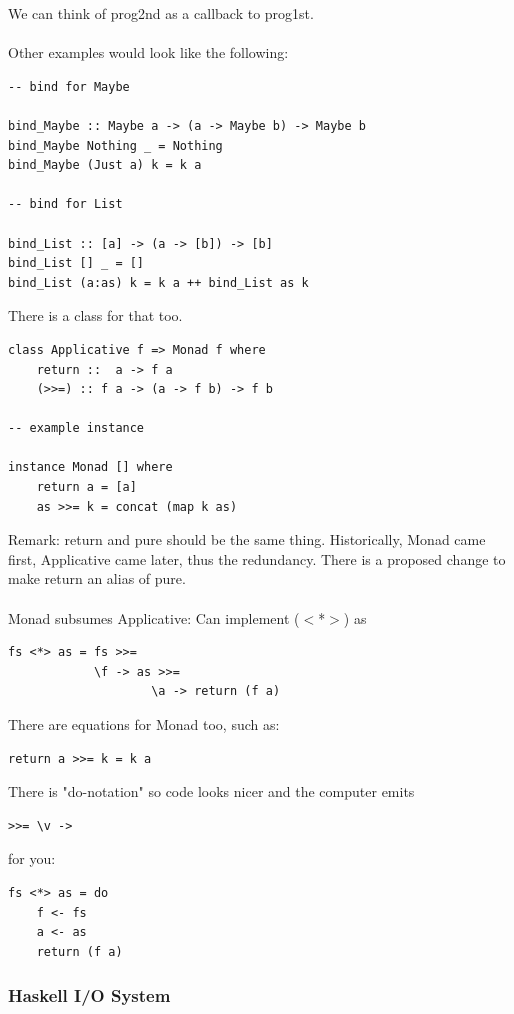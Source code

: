 \documentclass[12pt]{article}
\begin{document}
We can think of prog2nd as a callback to prog1st.\\
\\
Other examples would look like the following:

\begin{lstlisting}
-- bind for Maybe

bind_Maybe :: Maybe a -> (a -> Maybe b) -> Maybe b
bind_Maybe Nothing _ = Nothing
bind_Maybe (Just a) k = k a

-- bind for List

bind_List :: [a] -> (a -> [b]) -> [b]
bind_List [] _ = []
bind_List (a:as) k = k a ++ bind_List as k
\end{lstlisting}

There is a class for that too.
\begin{lstlisting}
class Applicative f => Monad f where
	return ::  a -> f a
	(>>=) :: f a -> (a -> f b) -> f b

-- example instance

instance Monad [] where
	return a = [a]
	as >>= k = concat (map k as)
\end{lstlisting}

Remark: return and pure should be the same thing. Historically, Monad came first, Applicative came later, thus the redundancy. There is a proposed change to make return an alias of pure.\\
\\
Monad subsumes Applicative: Can implement ($<$*$>$) as

\begin{lstlisting}
fs <*> as = fs >>=
			\f -> as >>=
					\a -> return (f a)
\end{lstlisting}

There are equations for Monad too, such as:
\begin{lstlisting}
return a >>= k = k a
\end{lstlisting}

There is "do-notation" so code looks nicer and the computer emits
\begin{lstlisting}
>>= \v ->
\end{lstlisting}
for you:
\begin{lstlisting}
fs <*> as = do
	f <- fs
	a <- as
	return (f a)
\end{lstlisting}

\subsubsection{Haskell I\slash O System}
\end{document}
